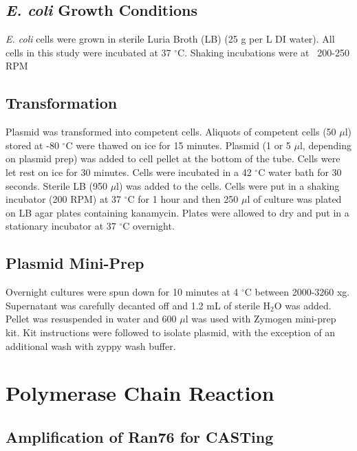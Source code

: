 \documentclass[12pt,twoside]{reedthesis}
\begin{document}
   \subsection{\textit{E. coli} Growth Conditions}
   \textit{E. coli} cells were grown in sterile Luria  Broth (LB) (25 g per L DI water). All cells in this study were incubated at 37 $^\circ$C. Shaking incubations were at ~200-250 RPM
   
   \subsection{Transformation}
   Plasmid was transformed into competent cells. Aliquots of competent cells (50 $\mu$l) stored at -80 $^\circ$C were thawed on ice for 15 minutes. Plasmid (1 or 5 $\mu$l, depending on plasmid prep) was added to cell pellet at the bottom of the tube. Cells were let rest on ice for 30 minutes. Cells were incubated in a 42 $^\circ$C water bath for 30 seconds. Sterile LB (950 $\mu$l) was added to the cells. Cells were put in a shaking incubator (200 RPM) at 37 $^\circ$C for 1 hour and then 250 $\mu$l of culture was plated on LB agar plates containing kanamycin. Plates were allowed to dry and put in a stationary incubator at 37 $^\circ$C overnight. 
   
   \subsection{Plasmid Mini-Prep}
   Overnight cultures were spun down for 10 minutes at 4 $^\circ$C between 2000-3260 xg. Supernatant was carefully decanted off and 1.2 mL of sterile H$_{2}$O was added. Pellet was resuspended in water and 600 $\mu$l was used with Zymogen mini-prep kit. Kit instructions were followed to isolate plasmid, with the exception of an additional wash with zyppy wash buffer. 
   
   
   
   
   \section{Polymerase Chain Reaction}
   
   \subsection{Amplification of Ran76 for CASTing}
   
\end{document}
